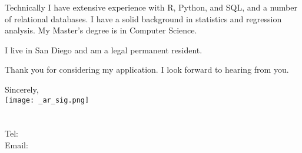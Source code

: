 \documentclass[letterpaper]{article}
\newcommand{\impt}[1]{\uline{#1}}
\begin{document}
Technically I have extensive experience with R, Python, and SQL, 
and a number of relational databases.
I have a solid background in statistics and regression analysis.
My Master's degree is in Computer Science.






I live in San Diego and am a legal permanent resident.  

Thank you for considering my application.
I look forward to hearing from you.  


Sincerely,\\
    \hspace{1em} 
    \texttt{[image: \_ar\_sig.png]} \\
    \CVname \\
    \small
    \CVaddresswrap \\
    Tel: \CVphone \\
    Email: \CVemail
\end{document}
